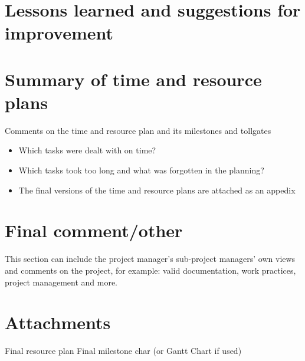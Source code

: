 \documentclass[11pt, titlepage]{article} %
\begin{document}
\section{Lessons learned and suggestions for improvement}



\section{Summary of time and resource plans}
Comments on the time and resource plan and its milestones and tollgates
\begin{itemize}
    \item Which tasks were dealt with on time?
    \item Which tasks took too long and what was forgotten in the planning?
    \item The final versions of the time and resource plans are attached as an appedix
\end{itemize}


\section{Final comment/other}
This section can include the project manager's sub-project managers' own views and comments on the project, for example: valid documentation, work practices, project management and more.


\section{Attachments}
Final resource plan
Final milestone char (or Gantt Chart if used)


\clearpage




\clearpage
\clearpage
\appendix
\end{document}
